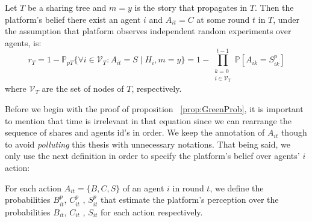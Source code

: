 \begin{prop}
	Let $T$ be a sharing tree and $m=y$ is the story that propagates in $T$. Then the platform's belief there exist an agent $i$ and $A_{it}=C$ at some round $t$ in $T$, under the assumption that platform observes independent random experiments over agents, is: 
	$$r_T = 1-\mathbb{P}_{pT} \{\forall i \in \mathcal{V}_{T}: A_{it}=S \mid H_i,m=y \} =  1 - \displaystyle \prod\limits_{\substack{k = 0 \\ i \in \mathcal{V}_{T}}}^{t-1} \mathbb{P} [A_{ik} = S_{ik}^p] $$ where $\mathcal{V}_{T}$ are the set of nodes of $T$, respectively.
	\label{prop:GreenProb}
\end{prop}

Before we begin with the proof of proposition ~\ref{prop:GreenProb}, it is important to mention that time is irrelevant in that equation since we can rearrange the sequence of shares and agents id's in order. We keep the annotation of $A_{it}$ though to avoid \textit{polluting} this thesis with unnecessary notations. That being said, we only use the next definition in order to specify the platform's belief over agents' $i$ action:

\begin{definition}
	For each action $A_{it} = \{B,C,S \}$ of an agent $i$ in round $t$, we define the probabilities $B_{it}^p$, $C_{it}^p$ , $S_{it}^p$ that estimate the platform's perception over the probabilities $B_{it}$, $C_{it}$ , $S_{it}$ for each action respectively.
\end{definition}


